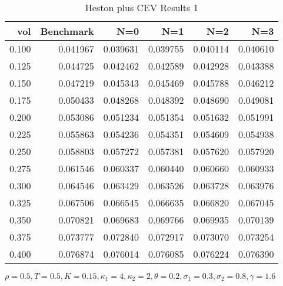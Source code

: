 \begin{table}[ht]
  \centering
  \caption{Heston plus CEV Results 1}
  \begin{tabular}{rrrrrr}
  \toprule
    vol &       Benchmark &       N=0 &       N=1 &       N=2 &       N=3 \\
  \midrule
  0.100 & 0.041967 & 0.039631 & 0.039755 & 0.040114 & 0.040610 \\
  0.125 & 0.044725 & 0.042462 & 0.042589 & 0.042928 & 0.043388 \\
  0.150 & 0.047219 & 0.045343 & 0.045469 & 0.045788 & 0.046212 \\
  0.175 & 0.050433 & 0.048268 & 0.048392 & 0.048690 & 0.049081 \\
  0.200 & 0.053086 & 0.051234 & 0.051354 & 0.051632 & 0.051991 \\
  0.225 & 0.055863 & 0.054236 & 0.054351 & 0.054609 & 0.054938 \\
  0.250 & 0.058803 & 0.057272 & 0.057381 & 0.057620 & 0.057920 \\
  0.275 & 0.061546 & 0.060337 & 0.060440 & 0.060660 & 0.060933 \\
  0.300 & 0.064546 & 0.063429 & 0.063526 & 0.063728 & 0.063976 \\
  0.325 & 0.067506 & 0.066545 & 0.066635 & 0.066820 & 0.067045 \\
  0.350 & 0.070821 & 0.069683 & 0.069766 & 0.069935 & 0.070139 \\
  0.375 & 0.073777 & 0.072840 & 0.072917 & 0.073070 & 0.073254 \\
  0.400 & 0.076874 & 0.076014 & 0.076085 & 0.076224 & 0.076390 \\
  \bottomrule
  \end{tabular}
  \small{$\rho = 0.5,T=0.5,K=0.15, \kappa_1 =4, \kappa_2 =2, \theta =0.2, \sigma_1 = 0.3, \sigma_2 =0.8, \gamma = 1.6$}
\end{table}

